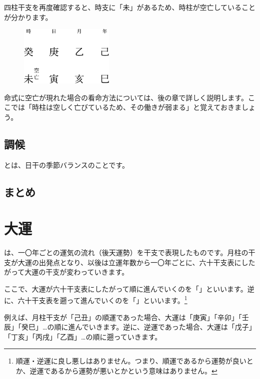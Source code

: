 \documentclass[a5paper,11pt,dvipdfmx]{tarticle}
\begin{document}
四柱干支を再度確認すると、時支に「未」があるため、時柱が空亡していることが分かります。

\begin{figure}[h]
  \includegraphics[width=45mm,angle=90]{figs/figure3-14.eps}
\end{figure}

命式に空亡が現れた場合の看命方法については、後の章で詳しく説明します。ここでは「時柱は空しく亡びているため、その働きが弱まる」と覚えておきましょう。

\subsection{調候}
とは、日干の季節バランスのことです。



\subsection{まとめ}


\clearpage

\section{大運}

は、一〇年ごとの運気の流れ（後天運勢）を干支で表現したものです。月柱の干支が大運の出発点となり、以後は立運年数から一〇年ごとに、六十干支表にしたがって大運の干支が変わっていきます。

ここで、大運が六十干支表にしたがって順に進んでいくのを「」といいます。逆に、六十干支表を遡って進んでいくのを「」といいます。\footnote{順運・逆運に良し悪しはありません。つまり、順運であるから運勢が良いとか、逆運であるから運勢が悪いとかという意味はありません。}

例えば、月柱干支が「己丑」の順運であった場合、大運は「庚寅」「辛卯」「壬辰」「癸巳」…の順に進んでいきます。逆に、逆運であった場合、大運は「戊子」「丁亥」「丙戌」「乙酉」…の順に遡っていきます。
\end{document}
